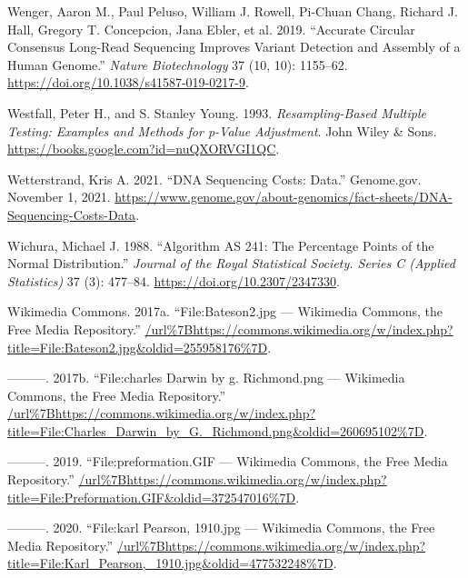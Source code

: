 \documentclass[
]{book}
\newlength{\cslhangindent}
\newlength{\cslentryspacingunit} %
\newenvironment{CSLReferences}[2] %
 {%
  \setlength{\parindent}{0pt}
  \ifodd #1
  \let\oldpar\par
  \def\par{\hangindent=\cslhangindent\oldpar}
  \fi
  \setlength{\parskip}{#2\cslentryspacingunit}
 }%
 {}
\begin{document}
\begin{CSLReferences}{1}{0}
\leavevmode{}%
Wenger, Aaron M., Paul Peluso, William J. Rowell, Pi-Chuan Chang, Richard J. Hall, Gregory T. Concepcion, Jana Ebler, et al. 2019. {``Accurate Circular Consensus Long-Read Sequencing Improves Variant Detection and Assembly of a Human Genome.''} \emph{Nature Biotechnology} 37 (10, 10): 1155--62. \url{https://doi.org/10.1038/s41587-019-0217-9}.

\leavevmode{}%
Westfall, Peter H., and S. Stanley Young. 1993. \emph{Resampling-{Based Multiple Testing}: {Examples} and {Methods} for p-{Value Adjustment}}. {John Wiley \& Sons}. \url{https://books.google.com?id=nuQXORVGI1QC}.

\leavevmode{}%
Wetterstrand, Kris A. 2021. {``{DNA Sequencing Costs}: {Data}.''} {Genome.gov}. November 1, 2021. \url{https://www.genome.gov/about-genomics/fact-sheets/DNA-Sequencing-Costs-Data}.

\leavevmode{}%
Wichura, Michael J. 1988. {``Algorithm {AS} 241: {The Percentage Points} of the {Normal Distribution}.''} \emph{Journal of the Royal Statistical Society. Series C (Applied Statistics)} 37 (3): 477--84. \url{https://doi.org/10.2307/2347330}.

\leavevmode{}%
Wikimedia Commons. 2017a. {``File:Bateson2.jpg --- Wikimedia Commons{,} the Free Media Repository.''} \url{/url\%7Bhttps://commons.wikimedia.org/w/index.php?title=File:Bateson2.jpg\&oldid=255958176\%7D}.

\leavevmode{}%
---------. 2017b. {``File:charles Darwin by g. Richmond.png --- Wikimedia Commons{,} the Free Media Repository.''} \url{/url\%7Bhttps://commons.wikimedia.org/w/index.php?title=File:Charles_Darwin_by_G._Richmond.png\&oldid=260695102\%7D}.

\leavevmode{}%
---------. 2019. {``File:preformation.GIF --- Wikimedia Commons{,} the Free Media Repository.''} \url{/url\%7Bhttps://commons.wikimedia.org/w/index.php?title=File:Preformation.GIF\&oldid=372547016\%7D}.

\leavevmode{}%
---------. 2020. {``File:karl Pearson, 1910.jpg --- Wikimedia Commons{,} the Free Media Repository.''} \url{/url\%7Bhttps://commons.wikimedia.org/w/index.php?title=File:Karl_Pearson,_1910.jpg\&oldid=477532248\%7D}.


\end{CSLReferences}
\end{document}
